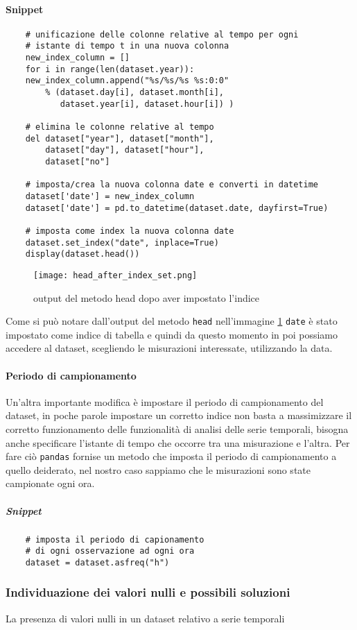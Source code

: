 \paragraph{Snippet}
\begin{verbatim}
    # unificazione delle colonne relative al tempo per ogni 
    # istante di tempo t in una nuova colonna
    new_index_column = []
    for i in range(len(dataset.year)):
    new_index_column.append("%s/%s/%s %s:0:0" 
        % (dataset.day[i], dataset.month[i], 
           dataset.year[i], dataset.hour[i]) )

    # elimina le colonne relative al tempo
    del dataset["year"], dataset["month"], 
        dataset["day"], dataset["hour"], 
        dataset["no"]

    # imposta/crea la nuova colonna date e converti in datetime
    dataset['date'] = new_index_column
    dataset['date'] = pd.to_datetime(dataset.date, dayfirst=True)

    # imposta come index la nuova colonna date
    dataset.set_index("date", inplace=True)
    display(dataset.head())
\end{verbatim}
\begin{figure}[h!]
    \texttt{[image: head\_after\_index\_set.png]}
    \caption{output del metodo head dopo aver impostato l'indice}
    \label{fig:head_after_index_set}
\end{figure}
Come si può notare dall'output del metodo \texttt{head} nell'immagine \ref*{fig:head_after_index_set}
\texttt{date} è stato impostato come indice di tabella e quindi da questo momento in poi
possiamo accedere al dataset, scegliendo le misurazioni interessate, utilizzando la
data.

\paragraph{Periodo di campionamento}
Un'altra importante modifica è impostare il periodo di campionamento del dataset,
in poche parole impostare un corretto indice non basta a massimizzare il corretto
funzionamento delle funzionalità di analisi delle serie temporali, bisogna anche specificare
l'istante di tempo che occorre tra una misurazione e l'altra. Per fare ciò
\texttt{pandas} fornise un metodo che imposta il periodo di campionamento
a quello deiderato, nel nostro caso sappiamo che le misurazioni sono state campionate
ogni ora.
\subparagraph{Snippet}
\begin{verbatim}
    # imposta il periodo di capionamento 
    # di ogni osservazione ad ogni ora
    dataset = dataset.asfreq("h")
\end{verbatim}

\subsubsection{Individuazione dei valori nulli e possibili soluzioni}
La presenza di valori nulli in un dataset relativo a serie temporali







